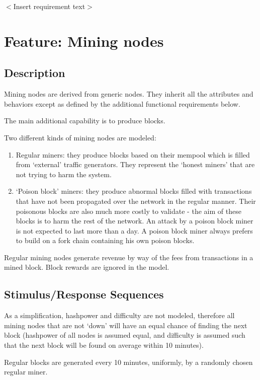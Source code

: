 \documentclass{scrreprt}
\begin{document}
$<$Insert requirement text$>$




\section{Feature: Mining nodes}

\subsection{Description}

Mining nodes are derived from generic nodes. They inherit all the
attributes and behaviors except as defined by the additional functional
requirements below.

The main additional capability is to produce blocks.

Two different kinds of mining nodes are modeled:

\begin{enumerate}
   \item Regular miners: they produce blocks based on their mempool which is filled from `external' traffic generators. They represent the `honest miners' that are not trying to harm the system.
   \item `Poison block' miners: they produce abnormal blocks filled with transactions that have not been propagated over the network in the regular manner. Their poisonous blocks are also much more costly to validate - the aim of these blocks is to harm the rest of the network. An attack by a poison block miner is not expected to last more than a day. A poison block miner always prefers to build on a fork chain containing his own poison blocks.
\end{enumerate}

Regular mining nodes generate revenue by way of the fees from transactions
in a mined block. Block rewards are ignored in the model.


\subsection{Stimulus/Response Sequences}

As a simplification, hashpower and difficulty are not modeled, therefore
all mining nodes that are not `down' will have an equal chance of finding
the next block (hashpower of all nodes is assumed equal, and difficulty
is assumed such that the next block will be found on average within 10
minutes).

Regular blocks are generated every 10 minutes, uniformly, by a randomly chosen
regular miner.
\end{document}
